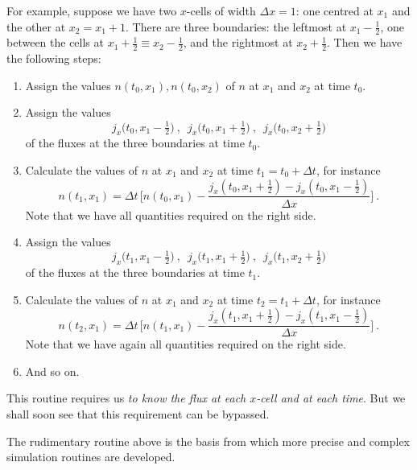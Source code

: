 \documentclass[a4paper,12pt,%
onecolumn,oneside,titlepage,%
british%
]{memoir}
\newcommand*{\incr}{\Delta}%
\renewcommand*{\|}[1][]{\nonscript\:#1\vert\nonscript\:\mathopen{}}
\newcommand*{\Dt}{\incr t}
\newcommand*{\Dx}{\incr x}
\begin{document}
For example, suppose we have two $x$-cells of width $\Dx=1$: one centred at $x_{1}$ and the other at $x_{2} = x_{1}+1$. There are three boundaries: the leftmost at $x_{1}-\tfrac12$, one between the cells at $x_{1}+\tfrac12 \equiv x_{2}-\tfrac12$, and the rightmost at $x_{2}+\tfrac12$. Then we have the following steps:

{\small
  
\begin{enumerate}[label=\arabic*.]
\item Assign the values $n(t_{0},x_{1}), n(t_{0},x_{2})$ of $n$ at $x_{1}$ and $x_{2}$ at time $t_{0}$.
  
\item Assign the values $$j_{x}\bigl(t_{0},x_{1}-\tfrac12\bigr)\ , \enspace j_{x}\bigl(t_{0},x_{1}+\tfrac12\bigr)\ , \enspace j_{x}\bigl(t_{0},x_{2}+\tfrac12\bigr)$$
  of the fluxes at the three boundaries at time $t_{0}$.
  
\item Calculate the values of $n$ at $x_{1}$ and $x_{2}$ at time $t_{1}=t_{0}+\Dt$, for instance
  $$ n(t_{1},x_{1}) =
  \Dt\,\biggl[ n(t_{0},x_{1}) - \frac{j_{x}(t_{0}, x_{1}+\tfrac12)-j_{x}(t_{0},x_{1}-\tfrac12)}{\Dx} \biggr] \ .$$
  Note that we have all quantities required on the right side.
  
\item Assign the values $$j_{x}\bigl(t_{1},x_{1}-\tfrac12\bigr)\ , \enspace j_{x}\bigl(t_{1},x_{1}+\tfrac12\bigr)\ , \enspace j_{x}\bigl(t_{1},x_{2}+\tfrac12\bigr)$$
  of the fluxes at the three boundaries at time $t_{1}$.
  
\item Calculate the values of $n$ at $x_{1}$ and $x_{2}$ at time $t_{2}=t_{1}+\Dt$, for instance
  $$ n(t_{2},x_{1}) =
  \Dt\,\biggl[ n(t_{1},x_{1}) - \frac{j_{x}(t_{1}, x_{1}+\tfrac12)-j_{x}(t_{1},x_{1}-\tfrac12)}{\Dx} \biggr] \ .$$
  Note that we have again all quantities required on the right side.

\item And so on.
\end{enumerate}

}

This routine requires us \emph{to know the flux at each $x$-cell and at each time}. But we shall soon see that this requirement can be bypassed.

The rudimentary routine above is the basis from which more precise and complex simulation routines are developed.
\end{document}
